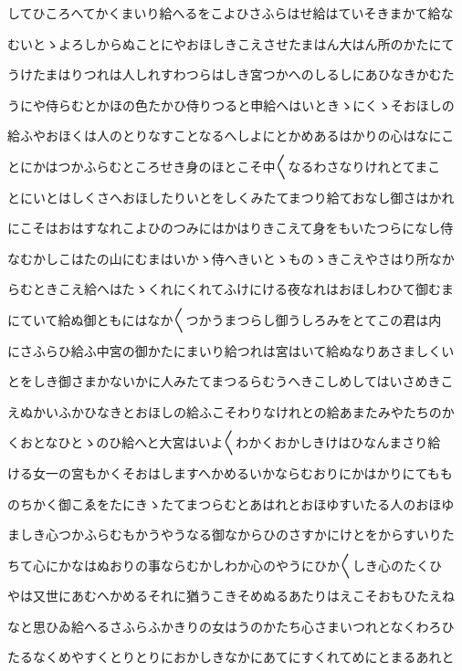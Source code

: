 \documentclass[a4paper,11pt,landscape]{ltjtarticle}
\begin{document}
してひころへてかくまいり給へるをこよひさふらはせ給はていそきまかて給な
\par\medskip
むいとゝよろしからぬことにやおほしきこえさせたまはん大はん所のかたにて
\par\medskip
うけたまはりつれは人しれすわつらはしき宮つかへのしるしにあひなきかむた
\par\medskip
うにや侍らむとかほの色たかひ侍りつると申給へはいときゝにくゝそおほしの
\par\medskip
給ふやおほくは人のとりなすことなるへしよにとかめあるはかりの心はなにこ
\par\medskip
とにかはつかふらむところせき身のほとこそ中〱なるわさなりけれとてまこ
\par\medskip
とにいとはしくさへおほしたりいとをしくみたてまつり給ておなし御さはかれ
\par\medskip
にこそはおはすなれこよひのつみにはかはりきこえて身をもいたつらになし侍
\par\medskip
なむかしこはたの山にむまはいかゝ侍へきいとゝものゝきこえやさはり所なか
\par\medskip
らむときこえ給へはたゝくれにくれてふけにける夜なれはおほしわひて御むま
\par\medskip
にていて給ぬ御ともにはなか〱つかうまつらし御うしろみをとてこの君は内
\par\medskip
にさふらひ給ふ中宮の御かたにまいり給つれは宮はいて給ぬなりあさましくい
\par\medskip
とをしき御さまかないかに人みたてまつるらむうへきこしめしてはいさめきこ
\par\medskip
えぬかいふかひなきとおほしの給ふこそわりなけれとの給あまたみやたちのか
\par\medskip
くおとなひとゝのひ給へと大宮はいよ〱わかくおかしきけはひなんまさり給
\par\medskip
ける女一の宮もかくそおはしますへかめるいかならむおりにかはかりにてもも
\par\medskip
のちかく御こゑをたにきゝたてまつらむとあはれとおほゆすいたる人のおほゆ
\par\medskip
ましき心つかふらむもかうやうなる御なからひのさすかにけとをからすいりた
\par\medskip
ちて心にかなはぬおりの事ならむかしわか心のやうにひか〱しき心のたくひ
\par\medskip
やは又世にあむへかめるそれに猶うこきそめぬるあたりはえこそおもひたえね
\par\medskip
なと思ひゐ給へるさふらふかきりの女はうのかたち心さまいつれとなくわろひ
\par\medskip
たるなくめやすくとりとりにおかしきなかにあてにすくれてめにとまるあれと
\end{document}
